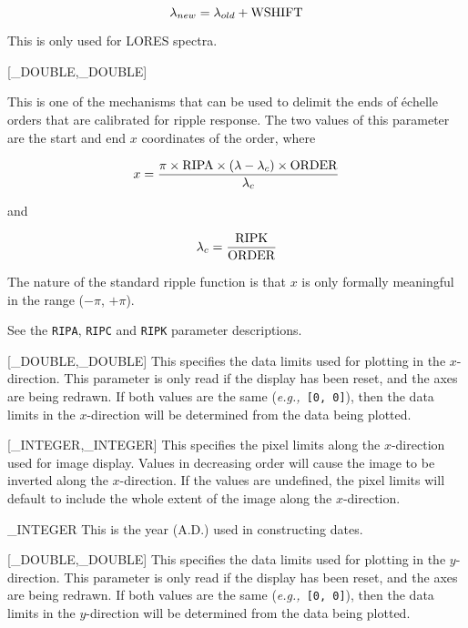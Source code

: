 {{   \begin {equation}
      \lambda_{new} = \lambda_{old} + {\rm WSHIFT}
   \end {equation}

   This is only used for LORES spectra.
}

{
   [\_DOUBLE,\_DOUBLE]
}{
   This is one of the mechanisms that can be used to delimit the
   ends of \'{e}chelle orders that are calibrated for ripple response.
   The two values of this parameter are the start and end $x$ coordinates
   of the order, where

   \begin {equation}
      x = \frac{\pi \times {\rm RIPA} \times (\lambda - \lambda_c)
                \times {\rm ORDER}}
               {\lambda_c}
   \end {equation}

   and

   \begin {equation}
      \lambda_c = \frac {\rm RIPK}{\rm ORDER}
   \end {equation}

   The nature of the standard ripple function is that $x$ is only
   formally meaningful in the range ($-\pi$, $+\pi$).

   See the \verb+RIPA+, \verb+RIPC+ and \verb+RIPK+ parameter descriptions.
}

{
   [\_DOUBLE,\_DOUBLE]
}{
   This specifies the data limits used for plotting in the $x$-direction.
   This parameter is only read if the display has been reset, and
   the axes are being redrawn.
   If both values are the same ({\it{e.g.,}}\ \verb+[0, 0]+),
   then the data limits in the $x$-direction will be determined from the
   data being plotted.
}

{
   [\_INTEGER,\_INTEGER]
}{
   This specifies the pixel limits along the $x$-direction used for
   image display.
   Values in decreasing order will cause the image to be inverted
   along the $x$-direction.
   If the values are undefined, the pixel limits will default to include
   the whole extent of the image along the $x$-direction.
}

{
   \_INTEGER
}{
   This is the year (A.D.) used in constructing dates.
}

{
   [\_DOUBLE,\_DOUBLE]
}{
   This specifies the data limits used for plotting in the $y$-direction.
   This parameter is only read if the display has been reset, and
   the axes are being redrawn.
   If both values are the same ({\it{e.g.,}}\ \verb+[0, 0]+),
   then the data limits in the $y$-direction will be determined from the
   data being plotted.
}

}
